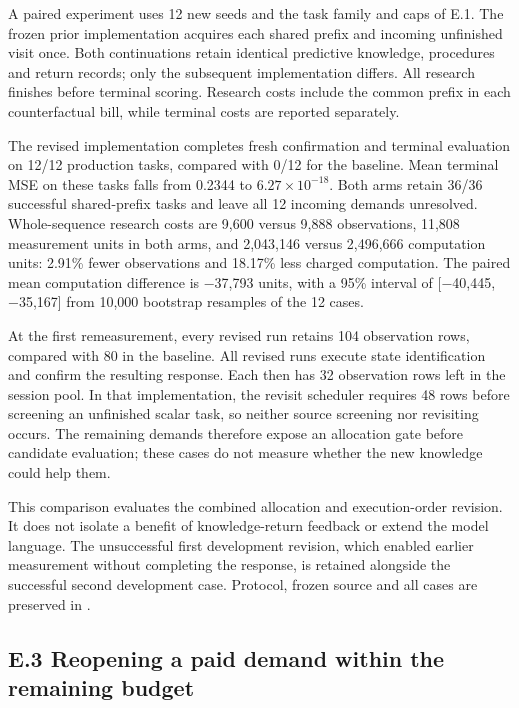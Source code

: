 \documentclass[11pt,a4paper]{article}
\begin{document}
A paired experiment uses 12 new seeds and the task family and caps of E.1. The
frozen prior implementation acquires each shared prefix and incoming unfinished
visit once. Both continuations retain identical predictive knowledge, procedures
and return records; only the subsequent implementation differs. All research
finishes before terminal scoring. Research costs include the common prefix in
each counterfactual bill, while terminal costs are reported separately.


The revised implementation completes fresh confirmation and terminal evaluation
on 12/12 production tasks, compared with 0/12 for the baseline. Mean terminal MSE
on these tasks falls from 0.2344 to \(6.27\times10^{-18}\). Both arms retain 36/36
successful shared-prefix tasks and leave all 12 incoming demands unresolved.
Whole-sequence research costs are 9,600 versus 9,888 observations, 11,808
measurement units in both arms, and 2,043,146 versus 2,496,666 computation units:
2.91\% fewer observations and 18.17\% less charged computation. The paired mean
computation difference is −37,793 units, with a 95\% interval of
[−40,445, −35,167] from 10,000 bootstrap resamples of the 12 cases.


At the first remeasurement, every revised run retains 104 observation rows,
compared with 80 in the baseline. All revised runs execute state identification
and confirm the resulting response. Each then has 32 observation rows left in
the session pool. In that implementation, the revisit scheduler requires 48 rows before screening an
unfinished scalar task, so neither source screening nor revisiting occurs.
The remaining demands therefore expose an allocation gate before candidate
evaluation; these cases do not measure whether the new knowledge could help them.


This comparison evaluates the combined allocation and execution-order revision.
It does not isolate a benefit of knowledge-return feedback or extend the model
language. The unsuccessful first development revision, which enabled earlier
measurement without completing the response, is retained alongside the successful
second development case. Protocol, frozen source and all cases are preserved in
.


\subsection*{E.3 Reopening a paid demand within the remaining budget}
\end{document}

